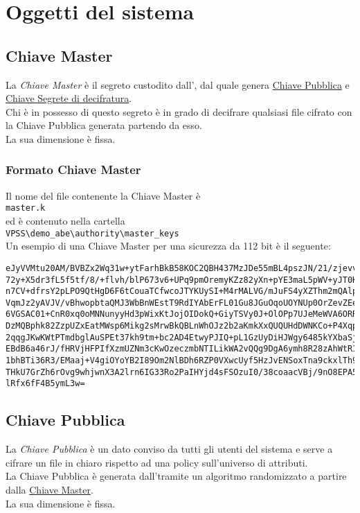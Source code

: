 \documentclass[a4paper,twoside,10pt,openany]{scrbook}
\begin{document}
\chapter{Oggetti del sistema}\label{sec:oggettisistema}
%
\section{Chiave Master}\label{sec:mk}
%
La \emph{Chiave Master} è il segreto custodito dall'\auth, dal quale genera \hyperref[sec:pk]{Chiave Pubblica} e \hyperref[sec:sk]{Chiave Segrete di decifratura}.\\
Chi è in possesso di questo segreto è in grado di decifrare qualsiasi file cifrato con la Chiave Pubblica generata partendo da esso.\\
La sua dimensione è fissa.
%
\subsection{Formato Chiave Master}\label{sec:format_mk}
%
Il nome del file contenente la Chiave Master è \\
\texttt{master.k}\\
ed è contenuto nella cartella\\
\texttt{VPSS\textbackslash demo\_abe\textbackslash authority\textbackslash master\_keys}\\
Un esempio di una Chiave Master per una sicurezza da 112 bit è il seguente:
\begin{verbatim}
eJyVVMtu20AM/BVBZx2Wq31w+ytFarhBkB58KOC2QBH437MzJDe55mBL4pszJN/21/zjevv967p/29
72y+X5dr3fL5f5tf/8/+flvh/blP673v6+UPq9pmOremyKZz82yXn+pYE3maL5pWV+yJT0KejnsbU2
n7CV+dfrsY2pLPO9QtHgD6F6tCouaTCfwcoJTYKUySI+M4rMALVG/mJuFS4yXZThm2mQAlpJqGxEKr
VqmJz2yAVJV/vBhwopbtaQMJ3WbBnWEstT9RdIYAbErFL01Gu8JGuOqoUOYNUp0OrZevZEeGnDna19
6VGSAC01+CnR0xq0oMNNunyyHd3pWixKtJojOIDokQ+GiyTSVy0J+OlOPp7UJeMeWVA6ORRXWvnA3W
DzMQBphk82ZzpUZxEatMWsp6Mikg2sMrwBkQBLnWhOJz2b2aKmkXxQUQUHdDWNKCo+P4Xqp8fcg1f5
2qqgJKwKWtPTmdbglAuSPEt37kh9tm+bc2AD4EtwyPJIQ+pL1GzUyDiHJWgy6485kYXbaSjipz62CM
EBdB6a46rJ/fHRVjHFPIfXzmUZNm3cKwOzeczmbNTILikWA2vQQg9DgA6ymh8R28zAhWtR1iZIiDTS
1bhBTi36R3/EMaaj+V4giOYoYB2I89Om2NlBDh6RZP0VXwcUyf5HzJvENSoxTna9ckxlTh9N44iyx+
THkU7GrZh6rOvg9whjwnX3A2lrn6IG33Ro2PaIHYjd4sFSOzuI0/38coaacVBj/9nO8EPA5vO6xL58
lRfx6fF4B5ymL3w=
\end{verbatim}
%
\section{Chiave Pubblica}\label{sec:pk}
La \emph{Chiave Pubblica} è un dato conviso da tutti gli utenti del sistema e serve a cifrare un file in chiaro rispetto ad una policy sull'universo di attributi. \\
La Chiave Pubblica è generata dall'\auth tramite un algoritmo randomizzato a partire dalla \hyperref[sec:mk]{Chiave Master}.\\
La sua dimensione è fissa.
%
\end{document}
